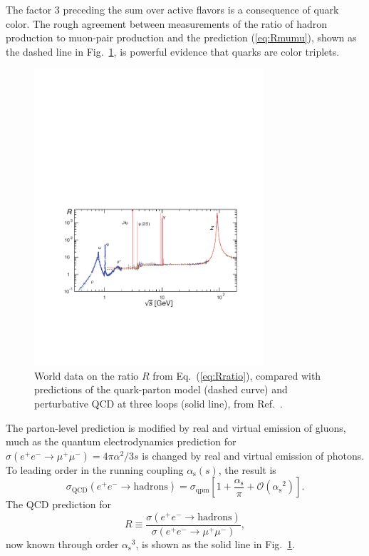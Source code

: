 \documentclass[prb,groupedaddress,nofootinbib,showpacs,twocolumn,floatfix]{revtex4}
\newcommand{\Eqn}[1]{Eq.~(\ref{#1})}
\newcommand{\alphas}{\ensuremath{\alpha_{\mathrm{s}}}}
\begin{document}
The factor 3 preceding the sum over active flavors is a
consequence of quark color. The rough agreement between measurements of
the ratio of hadron production to muon-pair production and the
prediction (\ref{eq:Rmumu}), shown as the dashed line in
Fig.~\ref{fig:Rmumu}, is powerful evidence that quarks are color
triplets.
%
\begin{figure}[bt] 
	\includegraphics[width=8.5cm]{fig/fig6}
	\vspace{10pt}
	\caption{World data on the ratio $R$ from \Eqn{eq:Rratio}, compared 
        with predictions of the quark-parton model (dashed curve) and
		perturbative QCD at three loops (solid line), from
		Ref.~.}
	\label{fig:Rmumu}
\end{figure}

The parton-level prediction is modified by real and virtual emission of
gluons, much as the quantum electrodynamics prediction for
$\sigma(e^+e^- \to \mu^+\mu^-) = {4\pi\alpha^2}/{3s}$ is changed by
real and virtual emission of photons. To leading order in the running
coupling $\alphas(s)$, the result is
\begin{equation}
    \sigma_{\mathrm{QCD}}(e^+e^- \to \mathrm{hadrons}) =
    \sigma_{\mathrm{qpm}}\left[ 1 + \frac{\alphas}{\pi} +
    \mathcal{O}(\alphas^2) \right].
    \label{eq:RinQCD}
\end{equation}
The QCD prediction for
\begin{equation}
    R \equiv \frac{\sigma(e^+e^-\to\mathrm{hadrons})}%
        {\sigma(e^+e^- \to \mu^+\mu^-)},
    \label{eq:Rratio}
\end{equation}
now known through order $\alphas^3$, is shown as the solid 
line in Fig.~\ref{fig:Rmumu}. 
\end{document}
